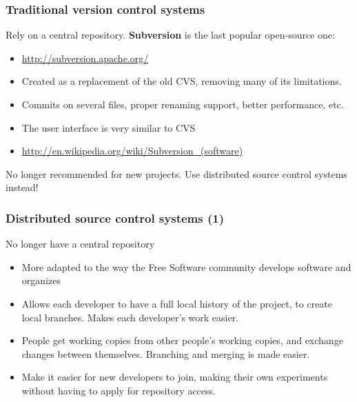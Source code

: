 \begin{frame}
  \frametitle{Traditional version control systems}
  Rely on a central repository. {\bf Subversion} is the last popular open-source one:
  \begin{itemize}
  \item \url{http://subversion.apache.org/}
  \item Created as a replacement of the old CVS, removing many of its
      limitations.
  \item Commits on several files, proper renaming support, better
      performance, etc.
  \item The user interface is very similar to CVS
  \item \url{http://en.wikipedia.org/wiki/Subversion_(software)}
  \end{itemize}
  No longer recommended for new projects. Use distributed source control
  systems instead!
\end{frame}

\begin{frame}
  \frametitle{Distributed source control systems (1)}
  No longer have a central repository
  \begin{itemize}
  \item More adapted to the way the Free Software community develops
    software and organizes
  \item Allows each developer to have a full local history of the
    project, to create local branches. Makes each developer's work
    easier.
  \item People get working copies from other people's working copies,
    and exchange changes between themselves. Branching and merging is
    made easier.
  \item Make it easier for new developers to join, making their own
    experiments without having to apply for repository access.
  \end{itemize}
\end{frame}

